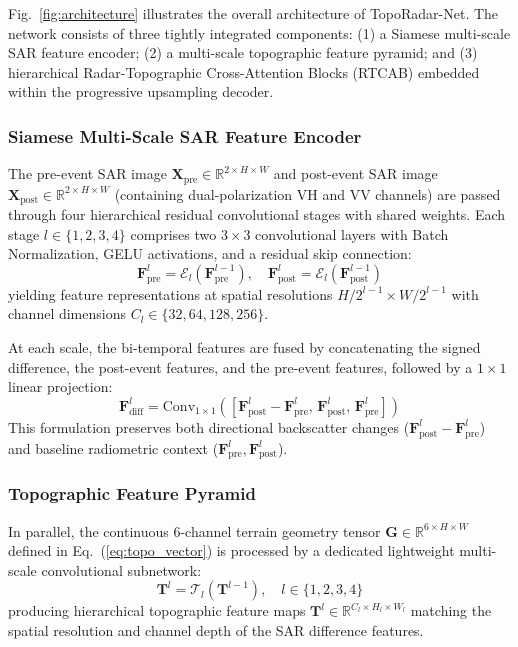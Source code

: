 Fig.~\ref{fig:architecture} illustrates the overall architecture of TopoRadar-Net. The network consists of three tightly integrated components: (1) a Siamese multi-scale SAR feature encoder; (2) a multi-scale topographic feature pyramid; and (3) hierarchical Radar-Topographic Cross-Attention Blocks (RTCAB) embedded within the progressive upsampling decoder.

\subsubsection{Siamese Multi-Scale SAR Feature Encoder}
The pre-event SAR image $\mathbf{X}_{\text{pre}} \in \mathbb{R}^{2 \times H \times W}$ and post-event SAR image $\mathbf{X}_{\text{post}} \in \mathbb{R}^{2 \times H \times W}$ (containing dual-polarization VH and VV channels) are passed through four hierarchical residual convolutional stages with shared weights. Each stage $l \in \{1, 2, 3, 4\}$ comprises two $3 \times 3$ convolutional layers with Batch Normalization, GELU activations, and a residual skip connection:
\begin{equation}
\mathbf{F}^l_{\text{pre}} = \mathcal{E}_l(\mathbf{F}^{l-1}_{\text{pre}}), \quad \mathbf{F}^l_{\text{post}} = \mathcal{E}_l(\mathbf{F}^{l-1}_{\text{post}})
\end{equation}
yielding feature representations at spatial resolutions $H/2^{l-1} \times W/2^{l-1}$ with channel dimensions $C_l \in \{32, 64, 128, 256\}$.

At each scale, the bi-temporal features are fused by concatenating the signed difference, the post-event features, and the pre-event features, followed by a $1 \times 1$ linear projection:
\begin{equation}
\mathbf{F}^l_{\text{diff}} = \text{Conv}_{1 \times 1} \left( \left[ \mathbf{F}^l_{\text{post}} - \mathbf{F}^l_{\text{pre}}, \, \mathbf{F}^l_{\text{post}}, \, \mathbf{F}^l_{\text{pre}} \right] \right)
\end{equation}
This formulation preserves both directional backscatter changes ($\mathbf{F}^l_{\text{post}} - \mathbf{F}^l_{\text{pre}}$) and baseline radiometric context ($\mathbf{F}^l_{\text{pre}}, \mathbf{F}^l_{\text{post}}$).

\subsubsection{Topographic Feature Pyramid}
In parallel, the continuous 6-channel terrain geometry tensor $\mathbf{G} \in \mathbb{R}^{6 \times H \times W}$ defined in Eq.~(\ref{eq:topo_vector}) is processed by a dedicated lightweight multi-scale convolutional subnetwork:
\begin{equation}
\mathbf{T}^l = \mathcal{T}_l(\mathbf{T}^{l-1}), \quad l \in \{1, 2, 3, 4\}
\end{equation}
producing hierarchical topographic feature maps $\mathbf{T}^l \in \mathbb{R}^{C_l \times H_l \times W_l}$ matching the spatial resolution and channel depth of the SAR difference features.

